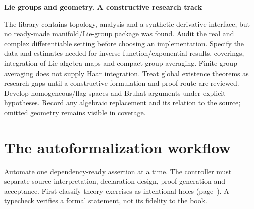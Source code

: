\documentclass[11pt,a4paper]{article}
\newcommand{\stage}[2]{\par\textbf{#1. #2}\par}
\begin{document}
\stage{Lie groups and geometry}{A constructive research track}
The library contains topology, analysis and a synthetic derivative interface,
but no ready-made manifold/Lie-group package was found. Audit the real and
complex differentiable setting before choosing an implementation. Specify
the data and estimates needed for inverse-function/exponential results,
coverings, integration of Lie-algebra maps and compact-group averaging.
Finite-group averaging does not supply Haar integration. Treat global
existence theorems as research gaps until a constructive formulation and proof
route are reviewed. Develop homogeneous/flag spaces and Bruhat arguments
under explicit hypotheses. Record any algebraic replacement and its relation
to the source; omitted geometry remains visible in coverage.

\newpage
\section{The autoformalization workflow}\label{sec:pipeline}
Automate one dependency-ready assertion at a time. The controller must
separate source interpretation, declaration design, proof generation and
acceptance. First classify theory exercises as intentional holes
(page~\pageref{sec:exercises}). A typecheck verifies a formal statement,
not its fidelity to the book.
\end{document}
